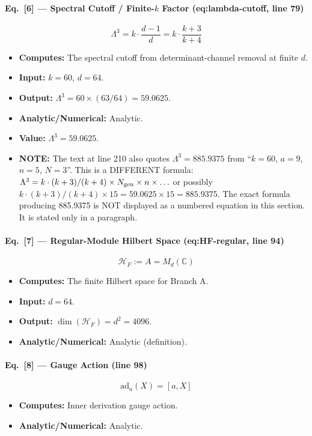 \paragraph{Eq.\ [6] --- Spectral Cutoff / Finite-$k$ Factor (eq:lambda-cutoff, line 79)}
\[
  \Lambda^3 = k \cdot \frac{d-1}{d} = k \cdot \frac{k+3}{k+4}
\]
\begin{itemize}
  \item \textbf{Computes:} The spectral cutoff from determinant-channel removal
        at finite $d$.
  \item \textbf{Input:} $k = 60$, $d = 64$.
  \item \textbf{Output:} $\Lambda^3 = 60 \times (63/64) = 59.0625$.
  \item \textbf{Analytic/Numerical:} Analytic.
  \item \textbf{Value:} $\Lambda^3 = 59.0625$.
  \item \textbf{NOTE:} The text at line 210 also quotes
        $\Lambda^3 = 885.9375$ from ``$k = 60$, $a = 9$, $n = 5$, $N = 3$''.
        This is a DIFFERENT formula:
        $\Lambda^3 = k \cdot (k+3)/(k+4) \times N_{\rm gen} \times n \times \ldots$
        or possibly $k \cdot (k+3)/(k+4) \times 15 = 59.0625 \times 15 = 885.9375$.
        The exact formula producing 885.9375 is NOT displayed as a numbered
        equation in this section. It is stated only in a paragraph.
\end{itemize}

\paragraph{Eq.\ [7] --- Regular-Module Hilbert Space (eq:HF-regular, line 94)}
\[
  \mathcal{H}_F := A = M_d(\mathbb{C})
\]
\begin{itemize}
  \item \textbf{Computes:} The finite Hilbert space for Branch A.
  \item \textbf{Input:} $d = 64$.
  \item \textbf{Output:} $\dim(\mathcal{H}_F) = d^2 = 4096$.
  \item \textbf{Analytic/Numerical:} Analytic (definition).
\end{itemize}

\paragraph{Eq.\ [8] --- Gauge Action (line 98)}
\[
  \mathrm{ad}_a(X) = [a, X]
\]
\begin{itemize}
  \item \textbf{Computes:} Inner derivation gauge action.
  \item \textbf{Analytic/Numerical:} Analytic.
\end{itemize}

